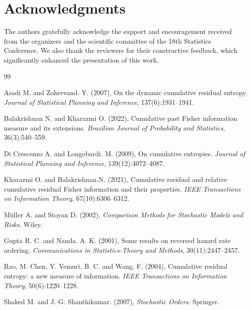 \documentclass[twoside]{article}
\begin{document}
\section*{Acknowledgments}

The authors gratefully acknowledge the support and encouragement received from the organizers and the scientific committee of the 18th Statistics Conference. We also thank the reviewers for their constructive feedback, which significantly enhanced the presentation of this work.

\begin{thebibliography}{99}
	
	 Asadi M. and  Zohrevand. Y.  (2007),
	 On the dynamic cumulative residual entropy.
	{\it Journal of Statistical Planning and Inference}, 137(6):1931–1941.
	
	 Balakrishnan N. and  Kharazmi O. (2022),
	 Cumulative past Fisher information measure and its extensions.
	{\it Brazilian Journal of Probability and Statistics}, 36(3):540–559.
	
	Di Crescenzo A.  and  Longobardi. M. (2009),
	 On cumulative entropies.
	{\it Journal of Statistical Planning and Inference}, 139(12):4072–4087.
	
	Kharazmi O.  and  Balakrishnan.N. (2021),
 Cumulative residual and relative cumulative residual Fisher information and their properties.
	{\it IEEE Transactions on Information Theory}, 67(10):6306–6312.
	
	 Müller A. and  Stoyan D. (2002),
	{\it Comparison Methods for Stochastic Models and Risks}.
	 Wiley.
	 
	  Gupta R. C. and Nanda.  A. K. (2001),
	  Some results on reversed hazard rate ordering.
	 {\it Communications in Statistics-Theory and Methods}, 30(11):2447–2457.
	 
	 Rao, M. Chen,  Y.  Vemuri, B. C. and  Wang. F. (2004),
	 Cumulative residual entropy: a new measure of information.
	{\it IEEE Transactions on Information Theory}, 50(6):1220–1228.
	
	 Shaked M. and J. G. Shanthikumar. (2007),
	{\it Stochastic Orders}.
	 Springer.
	
\end{thebibliography}
 
\end{document}
